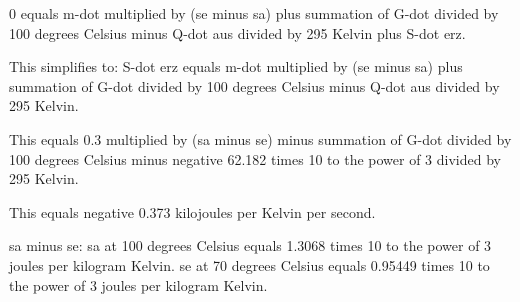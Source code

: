0 equals m-dot multiplied by (se minus sa) plus summation of G-dot divided by 100 degrees Celsius minus Q-dot aus divided by 295 Kelvin plus S-dot erz.  

This simplifies to:  
S-dot erz equals m-dot multiplied by (se minus sa) plus summation of G-dot divided by 100 degrees Celsius minus Q-dot aus divided by 295 Kelvin.  

This equals 0.3 multiplied by (sa minus se) minus summation of G-dot divided by 100 degrees Celsius minus negative 62.182 times 10 to the power of 3 divided by 295 Kelvin.  

This equals negative 0.373 kilojoules per Kelvin per second.  

sa minus se:  
sa at 100 degrees Celsius equals 1.3068 times 10 to the power of 3 joules per kilogram Kelvin.  
se at 70 degrees Celsius equals 0.95449 times 10 to the power of 3 joules per kilogram Kelvin.